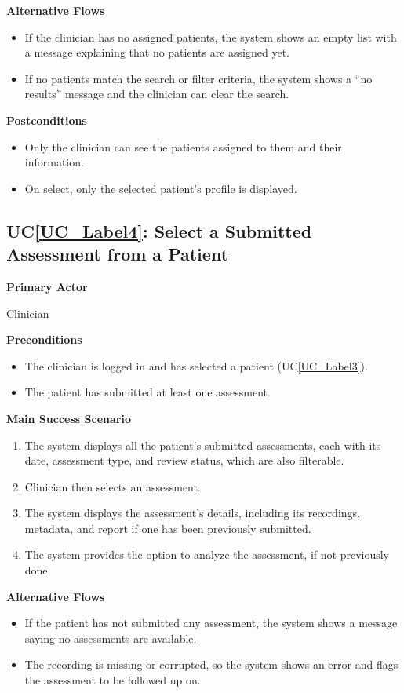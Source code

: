 \documentclass[12pt]{article}
\newcounter{ucnum} %
\newcommand{\ucref}[1]{UC\ref{#1}}
\begin{document}
\textbf{Alternative Flows}
\begin{itemize}
\item[2a.] If the clinician has no assigned patients, the system shows an empty list
  with a message explaining that no patients are assigned yet.
\item[4a.] If no patients match the search or filter criteria, the system shows a ``no
  results'' message and the clinician can clear the search.
\end{itemize}

\textbf{Postconditions}
\begin{itemize}
\item Only the clinician can see the patients assigned to them and their information.
\item On select, only the selected patient's profile is displayed.
\end{itemize}

 \label{UC_Label4}
\subsection{\ucref{UC_Label4}: Select a Submitted Assessment from a Patient}

\textbf{Primary Actor}

Clinician

\textbf{Preconditions}
\begin{itemize}
\item The clinician is logged in and has selected a patient
  (\ucref{UC_Label3}).
\item The patient has submitted at least one assessment.
\end{itemize}

\textbf{Main Success Scenario}
\begin{enumerate}
\item The system displays all the patient's submitted assessments, each with its
  date, assessment type, and review status, which are also filterable.
\item Clinician then selects an assessment.
\item The system displays the assessment's details, including its recordings, metadata,
  and report if one has been previously submitted.
\item The system provides the option to analyze the assessment, if not previously done.
\end{enumerate}

\textbf{Alternative Flows}
\begin{itemize}
\item[1a.] If the patient has not submitted any assessment, the system shows a
  message saying no assessments are available.
\item[3a.] The recording is missing or corrupted, so the system shows an error and
  flags the assessment to be followed up on.
\end{itemize}
\end{document}
